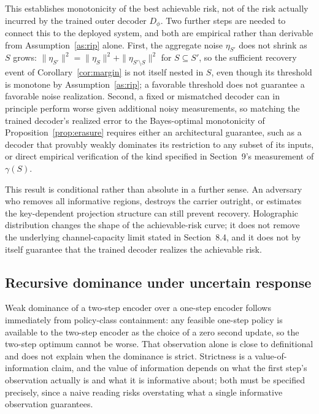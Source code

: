 \documentclass[11pt]{article}
\begin{document}
This establishes monotonicity of the best achievable risk, not of the risk actually incurred by the trained outer decoder $D_\phi$. Two further steps are needed to connect this to the deployed system, and both are empirical rather than derivable from Assumption~\ref{as:rip} alone. First, the aggregate noise $\eta_{S'}$ does not shrink as $S$ grows: $\|\eta_{S'}\|^2 = \|\eta_S\|^2 + \|\eta_{S'\setminus S}\|^2$ for $S \subseteq S'$, so the sufficient recovery event of Corollary~\ref{cor:margin} is not itself nested in $S$, even though its threshold is monotone by Assumption~\ref{as:rip}; a favorable threshold does not guarantee a favorable noise realization. Second, a fixed or mismatched decoder can in principle perform worse given additional noisy measurements, so matching the trained decoder's realized error to the Bayes-optimal monotonicity of Proposition~\ref{prop:erasure} requires either an architectural guarantee, such as a decoder that provably weakly dominates its restriction to any subset of its inputs, or direct empirical verification of the kind specified in Section~9's measurement of $\gamma(S)$.

This result is conditional rather than absolute in a further sense. An adversary who removes all informative regions, destroys the carrier outright, or estimates the key-dependent projection structure can still prevent recovery. Holographic distribution changes the shape of the achievable-risk curve; it does not remove the underlying channel-capacity limit stated in Section~8.4, and it does not by itself guarantee that the trained decoder realizes the achievable risk.

\subsection{Recursive dominance under uncertain response}

Weak dominance of a two-step encoder over a one-step encoder follows immediately from policy-class containment: any feasible one-step policy is available to the two-step encoder as the choice of a zero second update, so the two-step optimum cannot be worse. That observation alone is close to definitional and does not explain when the dominance is strict. Strictness is a value-of-information claim, and the value of information depends on what the first step's observation actually is and what it is informative about; both must be specified precisely, since a naive reading risks overstating what a single informative observation guarantees.
\end{document}
